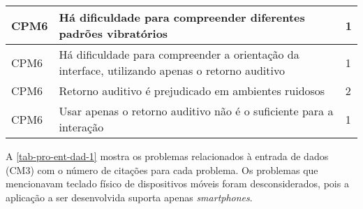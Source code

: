 \begin{table}[htb]
\begin{center}
\begin{tabular}{p{1.4cm}|p{11.7cm}|p{1.4cm}}
      \hline
      CPM6               & Há dificuldade para compreender diferentes padrões vibratórios                                  & 1                 \\
      \hline
      CPM6               & Há dificuldade para compreender a orientação da interface, utilizando apenas o retorno auditivo & 1                 \\
      \hline
      CPM6               & Retorno auditivo é prejudicado em ambientes ruidosos                                            & 2                 \\
      \hline
      CPM6               & Usar apenas o retorno auditivo não é o suficiente para a interação                              & 1                 \\
    \end{tabular}
  \end{center}
\end{table}

\newpage

A \autoref{tab-pro-ent-dad-1} mostra os problemas relacionados à entrada de dados (CM3) com o número de citações para cada problema.
Os problemas que mencionavam teclado físico de dispositivos móveis foram desconsiderados, pois a aplicação a ser desenvolvida suporta apenas \emph{smartphones}.

